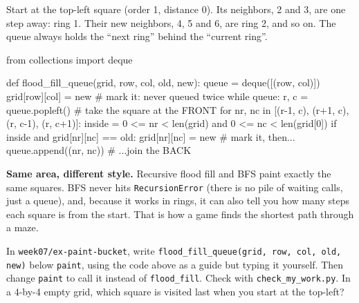 \begin{center}
\end{center}

Start at the top-left square (order 1, distance 0). Its neighbors, 2 and 3, are one step away: ring 1. Their new neighbors, 4, 5 and 6, are ring 2, and so on. The queue always holds the \enquote{next ring} behind the \enquote{current ring}.

\begin{pycode}
from collections import deque

def flood_fill_queue(grid, row, col, old, new):
    queue = deque([(row, col)])
    grid[row][col] = new                # mark it: never queued twice
    while queue:
        r, c = queue.popleft()          # take the square at the FRONT
        for nr, nc in [(r-1, c), (r+1, c), (r, c-1), (r, c+1)]:
            inside = 0 <= nr < len(grid) and 0 <= nc < len(grid[0])
            if inside and grid[nr][nc] == old:
                grid[nr][nc] = new      # mark it, then...
                queue.append((nr, nc))  # ...join the BACK
\end{pycode}

\textbf{Same area, different style.} Recursive flood fill and BFS paint exactly the same squares. BFS never hits \texttt{RecursionError} (there is no pile of waiting calls, just a queue), and, because it works in rings, it can also tell you how many steps each square is from the start. That is how a game finds the shortest path through a maze.

\begin{stretchchallenge}
In \texttt{week07/ex-paint-bucket}, write \texttt{flood\_fill\_queue(grid, row, col, old, new)} below \texttt{paint}, using the code above as a guide but typing it yourself. Then change \texttt{paint} to call it instead of \texttt{flood\_fill}. Check with \texttt{check\_my\_work.py}. In a 4-by-4 empty grid, which square is visited last when you start at the top-left? 
\end{stretchchallenge}

